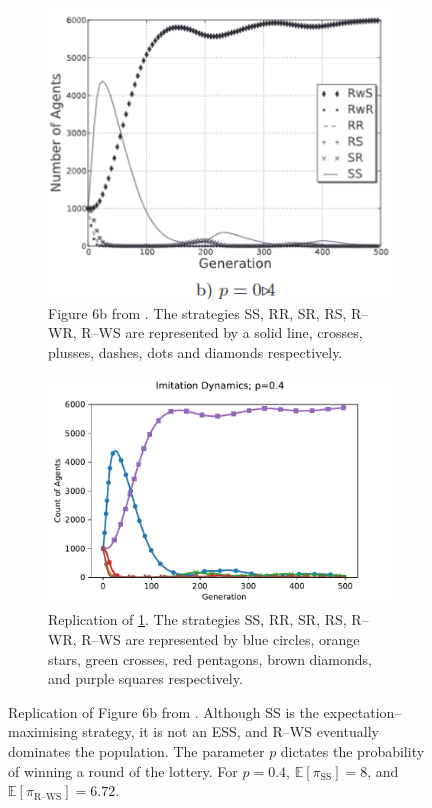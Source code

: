  \FloatBarrier 
\begin{figure}[!h]
  \begin{subfigure}[b]{0.45\textwidth}
    \includegraphics[width=\textwidth]{images/lotteryp4.png}
    \caption{Figure 6b from \cite{RN30}. The strategies SS, RR, SR, RS, R--WR, R--WS are represented by a solid line, crosses, plusses, dashes, dots and diamonds respectively.}
    \label{lotteryp4}
  \end{subfigure}
  \hfill
  \begin{subfigure}[b]{0.45\textwidth}
    \includegraphics[width=1.25\textwidth]{images/lotteryp4_me.pdf}
    \caption{Replication of \ref{lotteryp4}. The strategies SS, RR, SR, RS, R--WR, R--WS are represented by blue circles, orange stars, green crosses, red pentagons, brown diamonds, and purple squares respectively. }
    \label{lotteryp4_me}
  \end{subfigure}
  \caption{Replication of Figure 6b from \cite{RN30}. Although SS is the expectation--maximising strategy, it is not an ESS, and R--WS eventually dominates the population. The parameter $p$ dictates the probability of winning a round of the lottery. For $p=0.4$, $\mathbb E [\pi_{\text{SS}}] = 8$, and $\mathbb E [\pi_{\text{R--WS}}] =6.72 $.} \label{lottery_comp4}
\end{figure} 
